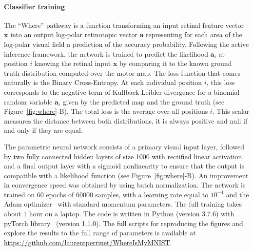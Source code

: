 \paragraph{Classifier training}
The ``Where'' pathway is a function transforming an input retinal feature vector $\boldsymbol{x}$ into an output log-polar retinotopic vector $\boldsymbol{a}$ representing for each area of the log-polar visual field a prediction of the accuracy probability. Following the active inference framework, the network is trained to predict the likelihood $\boldsymbol{a}_i$ at position $i$ knowing the retinal input $\boldsymbol{x}$ by comparing it to the known ground truth distribution computed over the motor map.
The loss function that comes naturally is the Binary Cross-Entropy. At each individual position $i$, this loss corresponds to the negative term of Kullback-Leibler divergence for a binomial random variable $\boldsymbol{a}_i$ given by the predicted map and the ground truth (see Figure~\ref{fig:where}-B).  The total loss is the average over all positions $i$. This scalar measures the distance between both distributions, it is always positive and null if and only if they are equal.

The parametric neural network consists of a primary visual input layer, followed by two fully connected hidden layers of size 1000  with rectified linear activation, and a final output layer with a sigmoid nonlinearity to ensure that the output is compatible with a likelihood function (see Figure~\ref{fig:where}-B). An improvement in convergence speed was obtained by using batch normalization. The network is trained on $60$ epochs of $60000$ samples, with a learning rate equal to $10^{-4}$ and the Adam optimizer~\cite{kingma2014adam} with standard momentum parameters. The full training takes about $1$ hour on a laptop. The code is written in Python (version 3.7.6) with pyTorch library~\cite{NEURIPS2019_9015} (version 1.1.0). The full scripts for reproducing the figures and explore the results to the full range of parameters is available at \url{https://github.com/laurentperrinet/WhereIsMyMNIST}. %


